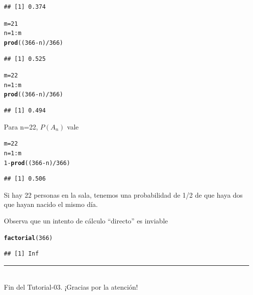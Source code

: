 \documentclass[10pt,a4paper]{article}\usepackage[]{graphicx}\usepackage[]{color}
\makeatletter
\newcommand{\hlnum}[1]{\textcolor[rgb]{0.686,0.059,0.569}{#1}}%
\newcommand{\hlopt}[1]{\textcolor[rgb]{0,0,0}{#1}}%
\newcommand{\hlstd}[1]{\textcolor[rgb]{0.345,0.345,0.345}{#1}}%
\newcommand{\hlkwb}[1]{\textcolor[rgb]{0.69,0.353,0.396}{#1}}%
\newcommand{\hlkwd}[1]{\textcolor[rgb]{0.737,0.353,0.396}{\textbf{#1}}}%
\newenvironment{kframe}{%
 \def\at@end@of@kframe{}%
 \ifinner\ifhmode%
  \def\at@end@of@kframe{\end{minipage}}%
  \begin{minipage}{\columnwidth}%
 \fi\fi%
 \def\FrameCommand##1{\hskip\@totalleftmargin \hskip-\fboxsep
 \colorbox{shadecolor}{##1}\hskip-\fboxsep
     \hskip-\linewidth \hskip-\@totalleftmargin \hskip\columnwidth}%
 \MakeFramed {\advance\hsize-\width
   \@totalleftmargin\z@ \linewidth\hsize
   \@setminipage}}%
 {\par\unskip\endMakeFramed%
 \at@end@of@kframe}
\newenvironment{knitrout}{}{} %
\newcounter {cont01}
\makeatother
\begin{document}
\begin{knitrout}
\begin{kframe}
\begin{verbatim}
## [1] 0.374
\end{verbatim}
\begin{alltt}
\hlstd{m} \hlkwb{=}\hlnum{21}
\hlstd{n} \hlkwb{=} \hlnum{1}\hlopt{:}\hlstd{m}
\hlkwd{prod}\hlstd{((}\hlnum{366}\hlopt{-}\hlstd{n)}\hlopt{/}\hlnum{366}\hlstd{)}
\end{alltt}
\begin{verbatim}
## [1] 0.525
\end{verbatim}
\begin{alltt}
\hlstd{m} \hlkwb{=}\hlnum{22}
\hlstd{n} \hlkwb{=} \hlnum{1}\hlopt{:}\hlstd{m}
\hlkwd{prod}\hlstd{((}\hlnum{366}\hlopt{-}\hlstd{n)}\hlopt{/}\hlnum{366}\hlstd{)}
\end{alltt}
\begin{verbatim}
## [1] 0.494
\end{verbatim}
\end{kframe}
\end{knitrout}

Para n=22, $P(A_n)$ vale 
\begin{knitrout}
\color{fgcolor}\begin{kframe}
\begin{alltt}
\hlstd{m} \hlkwb{=}\hlnum{22}
\hlstd{n} \hlkwb{=} \hlnum{1}\hlopt{:}\hlstd{m}
\hlnum{1}\hlopt{-}\hlkwd{prod}\hlstd{((}\hlnum{366}\hlopt{-}\hlstd{n)}\hlopt{/}\hlnum{366}\hlstd{)}
\end{alltt}
\begin{verbatim}
## [1] 0.506
\end{verbatim}
\end{kframe}
\end{knitrout}
    
Si hay 22 personas en la sala, tenemos una probabilidad de 1/2 de que haya dos que hayan nacido el mismo d\'ia.
    
Observa que un intento de cálculo ``directo'' 
es inviable
\begin{knitrout}
\color{fgcolor}\begin{kframe}
\begin{alltt}
\hlkwd{factorial}\hlstd{(}\hlnum{366}\hlstd{)}
\end{alltt}


{\ttfamily\noindent\color{warningcolor}{\#\# Warning in factorial(366): value out of range in 'gammafn'}}\begin{verbatim}
## [1] Inf
\end{verbatim}
\end{kframe}
\end{knitrout}


\vspace{2cm} \hrule
\quad\\
Fin del Tutorial-03. ¡Gracias por la atención!


%
%
\end{document}
